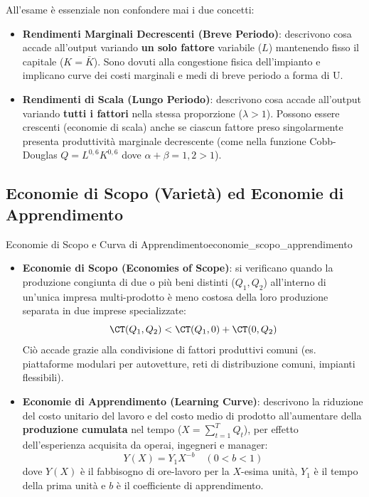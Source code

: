 \begin{esame}
All'esame è essenziale non confondere mai i due concetti:
\begin{itemize}
    \item \textbf{Rendimenti Marginali Decrescenti (Breve Periodo)}: descrivono cosa accade all'output variando \textbf{un solo fattore} variabile ($L$) mantenendo fisso il capitale ($K = \bar{K}$). Sono dovuti alla congestione fisica dell'impianto e implicano curve dei costi marginali e medi di breve periodo a forma di U.
    \item \textbf{Rendimenti di Scala (Lungo Periodo)}: descrivono cosa accade all'output variando \textbf{tutti i fattori} nella stessa proporzione ($\lambda > 1$). Possono essere crescenti (economie di scala) anche se ciascun fattore preso singolarmente presenta produttività marginale decrescente (come nella funzione Cobb-Douglas $Q = L^{0{,}6} K^{0{,}6}$ dove $\alpha + \beta = 1{,}2 > 1$).
\end{itemize}
\end{esame}

\subsection{Economie di Scopo (Varietà) ed Economie di Apprendimento}
\begin{definizione}{Economie di Scopo e Curva di Apprendimento}{economie_scopo_apprendimento}
\begin{itemize}
    \item \textbf{Economie di Scopo (Economies of Scope)}: si verificano quando la produzione congiunta di due o più beni distinti ($Q_1, Q_2$) all'interno di un'unica impresa multi-prodotto è meno costosa della loro produzione separata in due imprese specializzate:
    \begin{equation}
        \CT(Q_1, Q_2) < \CT(Q_1, 0) + \CT(0, Q_2)
    \end{equation}
    Ciò accade grazie alla condivisione di fattori produttivi comuni (es. piattaforme modulari per autovetture, reti di distribuzione comuni, impianti flessibili).
    \item \textbf{Economie di Apprendimento (Learning Curve)}: descrivono la riduzione del costo unitario del lavoro e del costo medio di prodotto all'aumentare della \textbf{produzione cumulata} nel tempo ($X = \sum_{t=1}^T Q_t$), per effetto dell'esperienza acquisita da operai, ingegneri e manager:
    \begin{equation}
        Y(X) = Y_1 X^{-b} \quad (0 < b < 1)
    \end{equation}
    dove $Y(X)$ è il fabbisogno di ore-lavoro per la $X$-esima unità, $Y_1$ è il tempo della prima unità e $b$ è il coefficiente di apprendimento.
\end{itemize}
\end{definizione}

